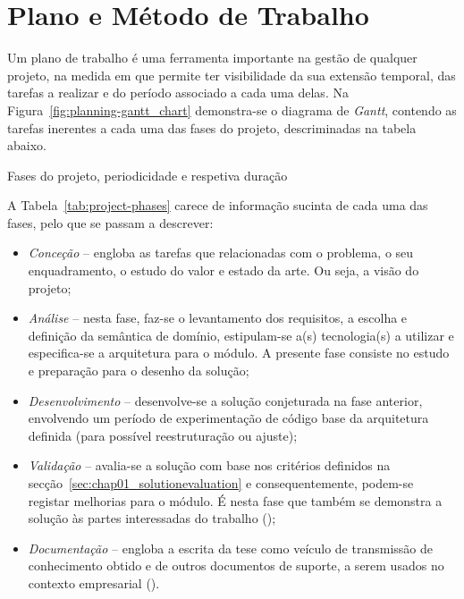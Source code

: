 \section{Plano e Método de Trabalho}
\label{sec:chap01_workmethodology}
Um plano de trabalho é uma ferramenta importante na gestão de qualquer projeto, na medida em que permite ter visibilidade da sua extensão temporal, das tarefas a realizar e do período associado a cada uma delas. Na Figura~\ref{fig:planning-gantt_chart} demonstra-se o diagrama de \textit{Gantt}, contendo as tarefas inerentes a cada uma das fases do projeto, descriminadas na tabela abaixo.

\begin{table}[!ht]
\caption{Fases do projeto, periodicidade e respetiva duração}
\label{tab:project-phases}
\centering
\resizebox{\textwidth}{!}{}
\end{table}

A Tabela~\ref{tab:project-phases} carece de informação sucinta de cada uma das fases, pelo que se passam a descrever:

\begin{itemize}
    \item
    {
        \textit{Conceção} -- engloba as tarefas que relacionadas com o problema, o seu enquadramento, o estudo do valor e estado da arte. Ou seja, a visão do projeto;
    }
    \item
    {
        \textit{Análise} -- nesta fase, faz-se o levantamento dos requisitos, a escolha e definição da semântica de domínio, estipulam-se a(s) tecnologia(s) a utilizar e especifica-se a arquitetura para o módulo. A presente fase consiste no estudo e preparação para o desenho da solução; 
    }
    \item
    {
        \textit{Desenvolvimento} -- desenvolve-se a solução conjeturada na fase anterior, envolvendo um período de experimentação de código base da arquitetura definida (para possível reestruturação ou ajuste);
    }
    \item
    {
        \textit{Validação} -- avalia-se a solução com base nos critérios definidos na secção~\ref{sec:chap01_solutionevaluation} e consequentemente, podem-se registar melhorias para o módulo. É nesta fase que também se demonstra a solução às partes interessadas do trabalho ();
    }
    \item
    {
        \textit{Documentação} -- engloba a escrita da tese como veículo de transmissão de conhecimento obtido e de outros documentos de suporte, a serem usados no contexto empresarial ().
    }
\end{itemize}


